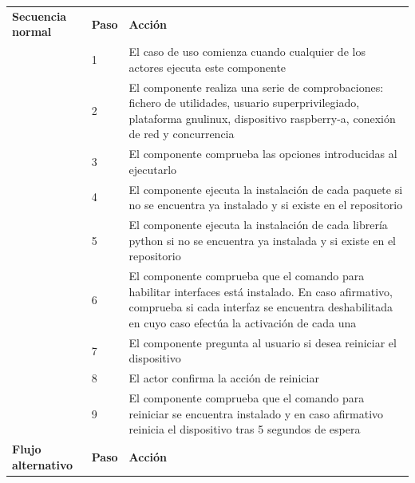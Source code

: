 \documentclass[12pt,a4paper, twoside]{report}
\begin{document}
\begin{longtable}{|p{3cm}|p{1cm}|p{12.5cm}|}
		\multirow{0}{3cm}{\cellcolor{Gainsboro}\textbf{Secuencia normal}} & \textbf{Paso} & \textbf{Acción}  \\ \cline{2-3} 
		\cellcolor{Gainsboro} & 1 & El caso de uso comienza cuando cualquier de los actores ejecuta este componente \\ \cline{2-3} 
		\cellcolor{Gainsboro} & 2 & El componente realiza una serie de comprobaciones: fichero de utilidades, usuario superprivilegiado, plataforma \gls{gnulinux}, dispositivo \gls{raspberry-a}, conexión de red y concurrencia \\ \cline{2-3} 
		\cellcolor{Gainsboro} & 3 & El componente comprueba las opciones introducidas al ejecutarlo \\ \cline{2-3} 
		\cellcolor{Gainsboro} & 4 & El componente ejecuta la instalación de cada paquete si no se encuentra ya instalado y si existe en el repositorio \\ \cline{2-3} 
		\cellcolor{Gainsboro} & 5 & El componente ejecuta la instalación de cada librería \gls{python} si no se encuentra ya instalada y si existe en el repositorio \\ \cline{2-3} 
		\cellcolor{Gainsboro} & 6 & El componente comprueba que el comando para habilitar interfaces está instalado. En caso afirmativo, comprueba si cada interfaz se encuentra deshabilitada en cuyo caso efectúa la activación de cada una \\ \cline{2-3} 
		\cellcolor{Gainsboro} & 7 & El componente pregunta al usuario si desea reiniciar el dispositivo \\ \cline{2-3} 
		\cellcolor{Gainsboro} & 8 & El actor confirma la acción de reiniciar \\ \cline{2-3} 
		\cellcolor{Gainsboro} & 9 & El componente comprueba que el comando para reiniciar se encuentra instalado y en caso afirmativo reinicia el dispositivo tras 5 segundos de espera \\ \hline

		\multirow{0}{3.2cm}{\cellcolor{Gainsboro}\textbf{Flujo alternativo}} & \textbf{Paso} & \textbf{Acción}  	\\ \cline{2-3} 
		

\end{longtable}
\end{document}
